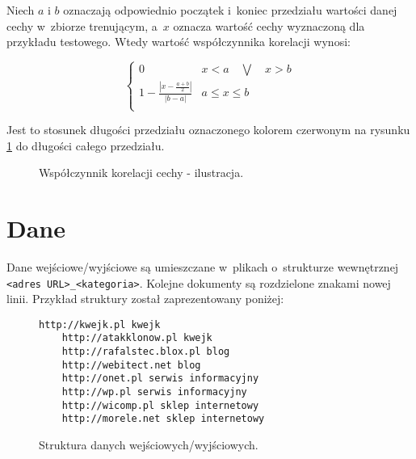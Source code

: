 \documentclass[a4paper,11pt]{article}
\newenvironment{definition}[1][Definicja]{\begin{trivlist}
\item[\hskip \labelsep {\bfseries #1}]}{\end{trivlist}}
\begin{document}
\begin{definition}
    Niech $a$ i $b$ oznaczają odpowiednio początek i~koniec przedziału wartości danej cechy w~zbiorze trenującym, a~$x$ oznacza wartość cechy wyznaczoną dla przykładu testowego. Wtedy wartość współczynnika korelacji wynosi:
    
    \begin{equation}
        \begin{cases}
            0 & x < a \quad \bigvee \quad x > b \\
            1 - \frac{|{x - \frac{a+b}{2}}|}{|{b - a}|} & a \leq x \leq b \\
        \end{cases}
    \end{equation}
\end{definition}

Jest to stosunek długości przedziału oznaczonego kolorem czerwonym na rysunku \ref{fig:correlation_index} do długości całego przedziału.

\begin{figure}[ht!]
\centering
{}
    \caption{Współczynnik korelacji cechy - ilustracja.}
    \label{fig:correlation_index}
\end{figure}

\section{Dane}

Dane wejściowe/wyjściowe są umieszczane w~plikach o~strukturze wewnętrznej \verb+<adres URL>_<kategoria>+. Kolejne dokumenty są rozdzielone znakami nowej linii. Przykład struktury został zaprezentowany poniżej:

\begin{figure}[ht!]
    \begin{Verbatim}[frame=single]
    http://kwejk.pl kwejk
    http://atakklonow.pl kwejk
    http://rafalstec.blox.pl blog
    http://webitect.net blog
    http://onet.pl serwis informacyjny
    http://wp.pl serwis informacyjny
    http://wicomp.pl sklep internetowy
    http://morele.net sklep internetowy
    \end{Verbatim}
    \caption{Struktura danych wejściowych/wyjściowych.}
    \label{fig:input_output_structure}
\end{figure}
\end{document}
